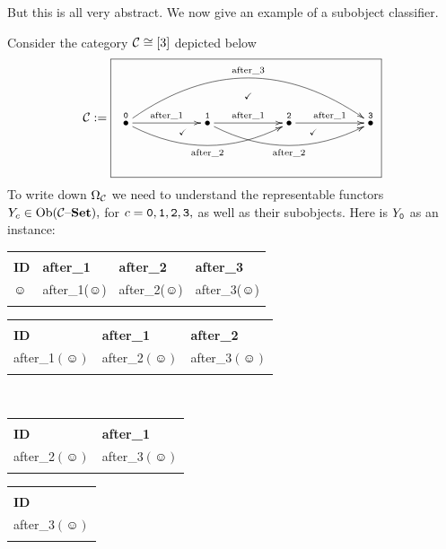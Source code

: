 \documentclass[CT4S-EN-RU]{subfiles}
\begin{document}
\begin{blockRUS}
\end{blockRUS}

\begin{blockENG}
But this is all very abstract. We now give an example of a subobject classifier.  
\end{blockENG}

\begin{blockRUS}
\end{blockRUS}

\begin{exampleENG}
Consider the category $\mathcal{C}\cong[3]$ depicted below
$$\mcC:=\parbox{3in}{\fbox{
\xymatrix{&&&\ar@{}[d]|(.4){\checkmark}&&&\\
\LTO{0}\ar[rr]^{\tn{after\_1}}\ar@/_1.5pc/[rrrr]_{\tn{after\_2}}\ar@/^3pc/[rrrrrr]^{\tn{after\_3}}&&\LTO{1}\ar[rr]^{\tn{after\_1}}\ar@/_1.5pc/[rrrr]_{\tn{after\_2}}&&\LTO{2}\ar[rr]^{\tn{after\_1}}&&\LTO{3}\\
&&&\ar@{}[ull]|(.8){\checkmark}\ar@{}[urr]|(.8){\checkmark}&&
}}}
$$
To write down $\Omega_\mathcal{C}$ we need to understand the representable functors $Y_c\in\textnormal{Ob}(\mathcal{C}{\text \textendash}{\mathbf{Set}}),$ for $c={\tt 0},{\tt 1},{\tt 2},{\tt 3},$ as well as their subobjects. Here is $Y_{\tt 0}$ as an instance:

\begin{center}\small
\begin{tabular}{| l || l | l | l |}
\bhline
\multicolumn{4}{|c|}{$Y_{\tt 0}({\tt 0})$}\\\bhline
{\bf ID}&{\bf after\_1}&{\bf after\_2}&{\bf after\_3}\\\bbhline
$\smiley$&after\_1($\smiley$)&after\_2($\smiley$)&after\_3($\smiley$)\\\bhline
\end{tabular}
\hsp
\begin{tabular}{| l || l | l |}
\bhline
\multicolumn{3}{|c|}{$Y_{\tt 0}({\tt 1})$}\\\bhline
{\bf ID}&{\bf after\_1}&{\bf after\_2}\\\bbhline
after\_1$(\smiley)$&after\_2$(\smiley)$&after\_3$(\smiley)$\\\bhline
\end{tabular}\\\vspace{.2in}
\begin{tabular}{| l || l |}
\bhline
\multicolumn{2}{|c|}{$Y_{\tt 0}({\tt 2})$}\\\bhline
{\bf ID}&{\bf after\_1}\\\bbhline
after\_2$(\smiley)$&after\_3$(\smiley)$\\\bhline
\end{tabular}
\hsp
\begin{tabular}{| l ||}
\bhline
\multicolumn{1}{|c|}{$Y_{\tt 0}({\tt 3})$}\\\bhline
{\bf ID}\\\bbhline
after\_3$(\smiley)$\\\bhline
\end{tabular}
\end{center}


\end{exampleENG}
\end{document}
